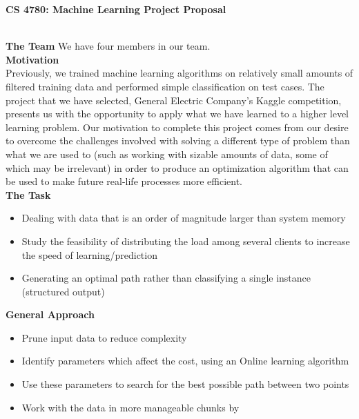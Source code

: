 \documentclass{article}[12pt]
\begin{document}
\begin{framed}
\noindent
\large{\textbf{CS 4780: Machine Learning \hfill Project Proposal}}
\end{framed}
\hspace*{\fill}\\
\Large{\textbf{The Team}}
\noindent We have four members in our team.
\hspace*{\fill}\\
\Large{\textbf{Motivation}}\\
\noindent Previously, we trained machine learning algorithms on relatively small amounts of filtered training data and performed simple classification on test cases. The project that we have selected, General Electric Company's Kaggle competition, presents us with the opportunity to apply what we have learned to a higher level learning problem. Our motivation to complete this project comes from our desire to overcome the challenges involved with solving a different type of problem than what we are used to (such as working with sizable amounts of data, some of which may be irrelevant) in order to produce an optimization algorithm that can be used to make future real-life processes more efficient.
\\[\baselineskip]
\noindent
\Large{\textbf{The Task}}
\begin{itemize}
	\item Dealing with data that is an order of magnitude larger than system memory
	\item Study the feasibility of distributing the load among several clients to increase the speed of learning/prediction
	\item Generating an optimal path rather than classifying a single instance (structured output)
\end{itemize}
\noindent
\Large{\textbf{General Approach}}%
\begin{itemize}
	\item Prune input data to reduce complexity
	\item Identify parameters which affect the cost, using an Online learning algorithm
	\item Use these parameters to search for the best possible path between two points
	\item Work with the data in more manageable chunks by 
\end{itemize}
\noindent
\end{document}
